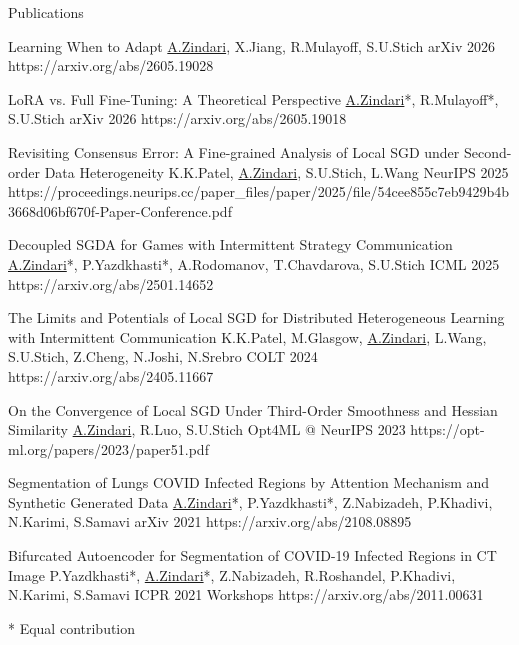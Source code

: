 \documentclass{resume}
\begin{document}
\begin{rSection}{Publications}

\publication
  {Learning When to Adapt}
  {\underline{A.Zindari}, X.Jiang, R.Mulayoff, S.U.Stich}
  {arXiv 2026}
  {https://arxiv.org/abs/2605.19028}

\publication
  {LoRA vs. Full Fine-Tuning: A Theoretical Perspective}
  {\underline{A.Zindari}*, R.Mulayoff*, S.U.Stich}
  {arXiv 2026}
  {https://arxiv.org/abs/2605.19018}

\publication
  {Revisiting Consensus Error: A Fine-grained Analysis of Local SGD under Second-order Data Heterogeneity}
  {K.K.Patel, \underline{A.Zindari}, S.U.Stich, L.Wang}
  {NeurIPS 2025}
  {https://proceedings.neurips.cc/paper_files/paper/2025/file/54cee855c7eb9429b4b3668d06bf670f-Paper-Conference.pdf}

\publication
  {Decoupled SGDA for Games with Intermittent Strategy Communication}
  {\underline{A.Zindari}*, P.Yazdkhasti*, A.Rodomanov, T.Chavdarova, S.U.Stich}
  {ICML 2025}
  {https://arxiv.org/abs/2501.14652}

\publication
  {The Limits and Potentials of Local SGD for Distributed Heterogeneous Learning with Intermittent Communication}
  {K.K.Patel, M.Glasgow, \underline{A.Zindari}, L.Wang, S.U.Stich, Z.Cheng, N.Joshi, N.Srebro}
  {COLT 2024}
  {https://arxiv.org/abs/2405.11667}

\publication
  {On the Convergence of Local SGD Under Third-Order Smoothness and Hessian Similarity}
  {\underline{A.Zindari}, R.Luo, S.U.Stich}
  {Opt4ML @ NeurIPS 2023}
  {https://opt-ml.org/papers/2023/paper51.pdf}

\publication
  {Segmentation of Lungs COVID Infected Regions by Attention Mechanism and Synthetic Generated Data}
  {\underline{A.Zindari}*, P.Yazdkhasti*, Z.Nabizadeh, P.Khadivi, N.Karimi, S.Samavi}
  {arXiv 2021}
  {https://arxiv.org/abs/2108.08895}

\begin{samepage}
\publication
  {Bifurcated Autoencoder for Segmentation of COVID-19 Infected Regions in CT Image}
  {P.Yazdkhasti*, \underline{A.Zindari}*, Z.Nabizadeh, R.Roshandel, P.Khadivi, N.Karimi, S.Samavi}
  {ICPR 2021 Workshops}
  {https://arxiv.org/abs/2011.00631}

{\small\textcolor{secondary}{* Equal contribution}}
\par
\end{samepage}

\end{rSection}
\end{document}
